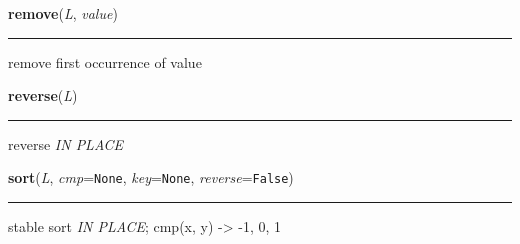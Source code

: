     \label{list:remove}

    \vspace{0.5ex}

    \begin{boxedminipage}{\textwidth}

    \raggedright \textbf{remove}(\textit{L}, \textit{value})

    \vspace{-1.5ex}

    \rule{\textwidth}{0.5\fboxrule}

remove first occurrence of value
    \vspace{1ex}

    \end{boxedminipage}

    \label{list:reverse}

    \vspace{0.5ex}

    \begin{boxedminipage}{\textwidth}

    \raggedright \textbf{reverse}(\textit{L})

    \vspace{-1.5ex}

    \rule{\textwidth}{0.5\fboxrule}

reverse \emph{IN PLACE}
    \vspace{1ex}

    \end{boxedminipage}

    \label{list:sort}

    \vspace{0.5ex}

    \begin{boxedminipage}{\textwidth}

    \raggedright \textbf{sort}(\textit{L}, \textit{cmp}=\texttt{None}, \textit{key}=\texttt{None}, \textit{reverse}=\texttt{False})

    \vspace{-1.5ex}

    \rule{\textwidth}{0.5\fboxrule}

stable sort \emph{IN PLACE};
cmp(x, y) -{\textgreater} -1, 0, 1
    \vspace{1ex}

    \end{boxedminipage}


